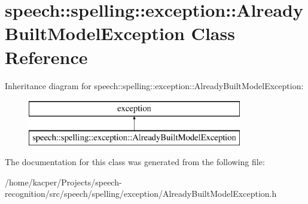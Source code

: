 \hypertarget{classspeech_1_1spelling_1_1exception_1_1AlreadyBuiltModelException}{\section{speech\+:\+:spelling\+:\+:exception\+:\+:Already\+Built\+Model\+Exception Class Reference}
\label{classspeech_1_1spelling_1_1exception_1_1AlreadyBuiltModelException}
}
Inheritance diagram for speech\+:\+:spelling\+:\+:exception\+:\+:Already\+Built\+Model\+Exception\+:\begin{figure}[H]
\begin{center}
\leavevmode
\includegraphics[height=2.000000cm]{classspeech_1_1spelling_1_1exception_1_1AlreadyBuiltModelException}
\end{center}
\end{figure}


The documentation for this class was generated from the following file\+:\begin{DoxyCompactItemize}
\item 
/home/kacper/\+Projects/speech-\/recognition/src/speech/spelling/exception/Already\+Built\+Model\+Exception.\+h\end{DoxyCompactItemize}
